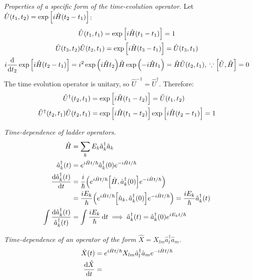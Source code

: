 \documentclass{report}
\begin{document}
\begin{subquests}
	\item \emph{Properties of a specific form of the time-evolution operator.} Let $\hat{U}(t_1,t_2) = \exp\bqty{i\hat{H}(t_2 - t_1)}$:
	\begin{gather*}
		\hat{U}(t_1,t_1) = \exp\bqty{i\hat{H}(t_1 - t_1)} = 1 \\
		\hat{U}(t_3,t_2)\hat{U}(t_2, t_1) = \exp\bqty{i\hat{H}(t_3 - t_1)} = \hat{U}(t_3,t_1) \\
		i\dv{t_2}\exp\bqty{i\hat{H}(t_2 - t_1)} = i^2\exp\pqty{i\hat{H}t_2}\hat{H}\exp\pqty{-i\hat{H}t_1} = \hat{H}\hat{U}(t_2, t_1),\;\because \bqty{\hat U, \hat H} = 0
	\end{gather*}
	The time evolution operator is unitary, so $\hat{U}^{-1} = \hat{U}^{\dagger}$. Therefore:
	\begin{align*}
		\hat{U}^{\dagger}(t_2, t_1) & = \exp\bqty{i\hat{H}(t_1 - t_2)} = \hat{U}(t_1,t_2) \\
		\hat{U}^{\dagger}(t_2, t_1)\hat{U}(t_2,t_1) & = \exp\bqty{i\hat{H}(t_1 - t_2)}\exp\bqty{i\hat{H}(t_2 - t_1)} = 1
	\end{align*}

	\item \emph{Time-dependence of ladder operators.}
	\begin{align*}
		\hat{H} & = \sum_k E_k \hat{a}_k^\dagger \hat{a}_k \\
		\hat{a}^{\dagger}_{k}(t) & = e^{i\hat{H}t/\hbar}\hat{a}^{\dagger}_{k}(0)e^{-i\hat{H}t/\hbar} \\
		\dv{\hat{a}^{\dagger}_{k}(t)}{t} & = \frac{i}{\hbar}\pqty{e^{i\hat{H}t/\hbar}\bqty{\hat{H},\hat{a}^{\dagger}_{k}(0)}e^{-i\hat{H}t/\hbar}} \\
		& = \frac{iE_k}{\hbar}\pqty{e^{i\hat{H}t/\hbar}\bqty{\hat{n}_k,\hat{a}^{\dagger}_{k}(0)}e^{-i\hat{H}t/\hbar}} = \frac{iE_k}{\hbar}\hat{a}^{\dagger}_{k}(t) \\
		\int \frac{\dd{\hat{a}^{\dagger}_{k}(t)}}{\hat{a}^{\dagger}_{k}(t)} & 	= \int \frac{iE_k}{\hbar}\dd{t} \implies \hat{a}^{\dagger}_{k}(t) = \hat{a}^{\dagger}_{k}(0)e^{iE_kt/\hbar}
	\end{align*}

	\item \emph{Time-dependence of an operator of the form $\hat X = X_{lm} \hat{a}^{\dagger}_l \hat{a}_m$.}
	\begin{align*}
		\hat{X}(t) & = e^{i\hat{H}t/\hbar}X_{lm}\hat{a}^{\dagger}_l \hat{a}_m e^{-i\hat{H}t/\hbar} \\
		\dv{\hat{X}}{t} & = 
	\end{align*}


\end{subquests}
\end{document}
